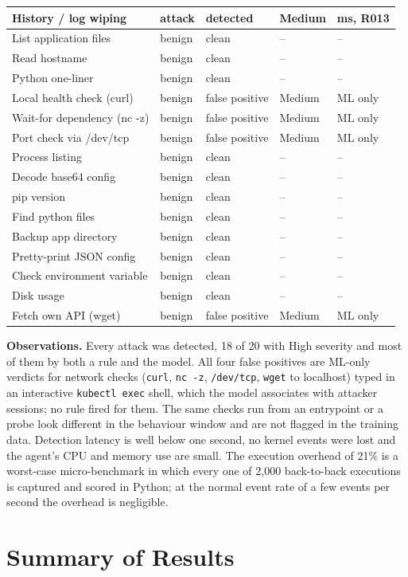 {\begin{longtable}{>{\raggedright\arraybackslash}p{4.4cm} l l l >{\raggedright\arraybackslash}p{3.2cm}}
History / log wiping & attack & detected & Medium & 191 ms, R013 \\
\midrule
List application files & benign & clean & -- & -- \\
Read hostname & benign & clean & -- & -- \\
Python one-liner & benign & clean & -- & -- \\
Local health check (curl) & benign & false positive & Medium & ML only \\
Wait-for dependency (nc -z) & benign & false positive & Medium & ML only \\
Port check via /dev/tcp & benign & false positive & Medium & ML only \\
Process listing & benign & clean & -- & -- \\
Decode base64 config & benign & clean & -- & -- \\
pip version & benign & clean & -- & -- \\
Find python files & benign & clean & -- & -- \\
Backup app directory & benign & clean & -- & -- \\
Pretty-print JSON config & benign & clean & -- & -- \\
Check environment variable & benign & clean & -- & -- \\
Disk usage & benign & clean & -- & -- \\
Fetch own API (wget) & benign & false positive & Medium & ML only \\
\bottomrule
\end{longtable}
}

\textbf{Observations.} Every attack was detected, 18 of 20 with High severity and
most of them by both a rule and the model. All four false positives are ML-only
verdicts for network checks (\texttt{curl}, \texttt{nc -z}, \texttt{/dev/tcp},
\texttt{wget} to localhost) typed in an interactive \texttt{kubectl exec} shell, which
the model associates with attacker sessions; no rule fired for them. The same checks
run from an entrypoint or a probe look different in the behaviour window and are not
flagged in the training data. Detection latency is well below one second, no kernel
events were lost and the agent's CPU and memory use are small. The execution overhead
of 21\% is a worst-case micro-benchmark in which every one of 2,000 back-to-back
executions is captured and scored in Python; at the normal event rate of a few events
per second the overhead is negligible.

\section{Summary of Results}

